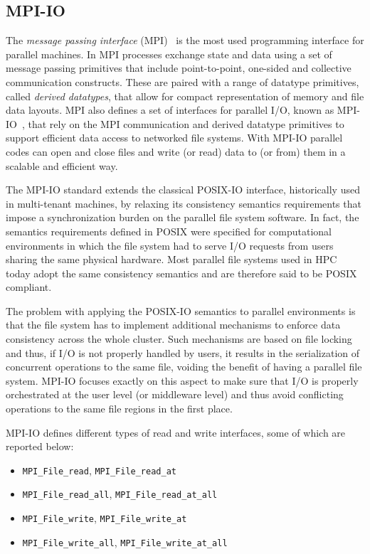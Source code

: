 \subsection{MPI-IO}
The \textit{message passing interface} (MPI)~\cite{mpispecs} is the most used programming interface for parallel machines. In MPI processes exchange state and data using a set of message passing primitives that include 
point-to-point, one-sided and collective communication constructs. These are paired with a range of datatype primitives, called \textit{derived datatypes}, that allow for compact representation of memory and file data 
layouts. 
MPI also defines a set of interfaces for parallel I/O, known as MPI-IO~\cite{mpispecs}, that rely on the MPI communication and derived datatype primitives to support efficient data access to networked file systems. With MPI-IO 
parallel codes can open and close files and write (or read) data to (or from) them in a scalable and efficient way.

The MPI-IO standard extends the classical POSIX-IO interface, historically used in multi-tenant machines, by relaxing its consistency semantics requirements that impose a synchronization burden on the parallel file 
system software. In fact, the semantics requirements defined in POSIX were specified for computational environments in which the file system had to serve I/O requests from users sharing the same physical hardware. Most 
parallel file systems used in HPC today adopt the same consistency semantics and are therefore said to be POSIX compliant. 

The problem with applying the POSIX-IO semantics to parallel environments is that the file system has to implement additional mechanisms to enforce data consistency across the whole cluster. Such mechanisms are based 
on file locking and thus, if I/O is not properly handled by users, it results in the serialization of concurrent operations to the same file, voiding the benefit of having a parallel file system. MPI-IO focuses exactly 
on this aspect to make sure that I/O is properly orchestrated at the user level (or middleware level) and thus avoid conflicting operations to the same file regions in the first place.

MPI-IO defines different types of read and write interfaces, some of which are reported below:

\begin{itemize}
\item \texttt{MPI\_File\_read}, \texttt{MPI\_File\_read\_at}
\item \texttt{MPI\_File\_read\_all}, \texttt{MPI\_File\_read\_at\_all}
\item \texttt{MPI\_File\_write}, \texttt{MPI\_File\_write\_at}
\item \texttt{MPI\_File\_write\_all}, \texttt{MPI\_File\_write\_at\_all}
\end{itemize}

